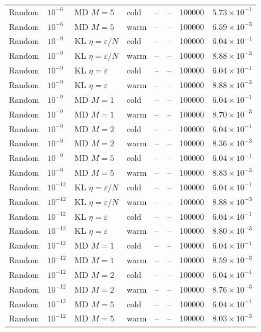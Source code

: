 \begin{table}[t]
\begin{tabular}{llllrrrr}
Random & $10^{-6}$ & MD $M=5$ & cold & -- & -- & 100000 & $5.73\times 10^{-1}$ \\
Random & $10^{-6}$ & MD $M=5$ & warm & -- & -- & 100000 & $6.59\times 10^{-3}$ \\
\midrule
Random & $10^{-9}$ & KL $\eta=\varepsilon/N$ & cold & -- & -- & 100000 & $6.04\times 10^{-1}$ \\
Random & $10^{-9}$ & KL $\eta=\varepsilon/N$ & warm & -- & -- & 100000 & $8.88\times 10^{-3}$ \\
Random & $10^{-9}$ & KL $\eta=\varepsilon$ & cold & -- & -- & 100000 & $6.04\times 10^{-1}$ \\
Random & $10^{-9}$ & KL $\eta=\varepsilon$ & warm & -- & -- & 100000 & $8.88\times 10^{-3}$ \\
Random & $10^{-9}$ & MD $M=1$ & cold & -- & -- & 100000 & $6.04\times 10^{-1}$ \\
Random & $10^{-9}$ & MD $M=1$ & warm & -- & -- & 100000 & $8.70\times 10^{-3}$ \\
Random & $10^{-9}$ & MD $M=2$ & cold & -- & -- & 100000 & $6.04\times 10^{-1}$ \\
Random & $10^{-9}$ & MD $M=2$ & warm & -- & -- & 100000 & $8.36\times 10^{-3}$ \\
Random & $10^{-9}$ & MD $M=5$ & cold & -- & -- & 100000 & $6.04\times 10^{-1}$ \\
Random & $10^{-9}$ & MD $M=5$ & warm & -- & -- & 100000 & $8.83\times 10^{-3}$ \\
\midrule
Random & $10^{-12}$ & KL $\eta=\varepsilon/N$ & cold & -- & -- & 100000 & $6.04\times 10^{-1}$ \\
Random & $10^{-12}$ & KL $\eta=\varepsilon/N$ & warm & -- & -- & 100000 & $8.88\times 10^{-3}$ \\
Random & $10^{-12}$ & KL $\eta=\varepsilon$ & cold & -- & -- & 100000 & $6.04\times 10^{-1}$ \\
Random & $10^{-12}$ & KL $\eta=\varepsilon$ & warm & -- & -- & 100000 & $8.80\times 10^{-3}$ \\
Random & $10^{-12}$ & MD $M=1$ & cold & -- & -- & 100000 & $6.04\times 10^{-1}$ \\
Random & $10^{-12}$ & MD $M=1$ & warm & -- & -- & 100000 & $8.59\times 10^{-3}$ \\
Random & $10^{-12}$ & MD $M=2$ & cold & -- & -- & 100000 & $6.04\times 10^{-1}$ \\
Random & $10^{-12}$ & MD $M=2$ & warm & -- & -- & 100000 & $8.76\times 10^{-3}$ \\
Random & $10^{-12}$ & MD $M=5$ & cold & -- & -- & 100000 & $6.04\times 10^{-1}$ \\
Random & $10^{-12}$ & MD $M=5$ & warm & -- & -- & 100000 & $8.03\times 10^{-3}$ \\
\bottomrule
\end{tabular}
\end{table}